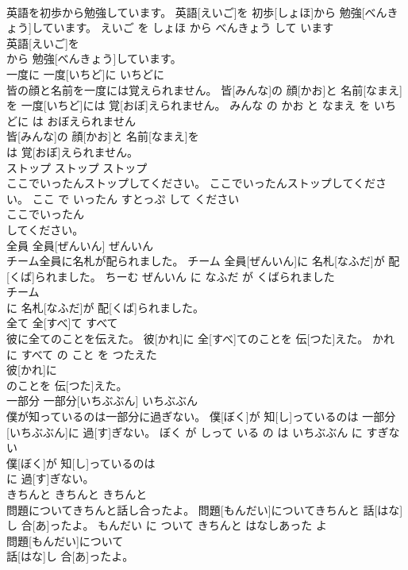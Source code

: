 \documentclass[8pt]{extreport}
\begin{document}
\begin{CJK}{UTF8}{min}
\\	英語を初歩から勉強しています。	英語[えいご]を 初歩[しょほ]から 勉強[べんきょう]しています。	えいご を しょほ から べんきょう して います	
\\	英語[えいご]を
\\	から 勉強[べんきょう]しています。			
\\	一度に	一度[いちど]に	いちどに	
\\	皆の顔と名前を一度には覚えられません。	皆[みんな]の 顔[かお]と 名前[なまえ]を 一度[いちど]には 覚[おぼ]えられません。	みんな の かお と なまえ を いちどに は おぼえられません	
\\	皆[みんな]の 顔[かお]と 名前[なまえ]を
\\	は 覚[おぼ]えられません。			
\\	ストップ	ストップ	ストップ	
\\	ここでいったんストップしてください。	ここでいったんストップしてください。	ここ で いったん すとっぷ して ください	
\\	ここでいったん
\\	してください。			
\\	全員	全員[ぜんいん]	ぜんいん	
\\	チーム全員に名札が配られました。	チーム 全員[ぜんいん]に 名札[なふだ]が 配[くば]られました。	ちーむ ぜんいん に なふだ が くばられました	
\\	チーム
\\	に 名札[なふだ]が 配[くば]られました。			
\\	全て	全[すべ]て	すべて	
\\	彼に全てのことを伝えた。	彼[かれ]に 全[すべ]てのことを 伝[つた]えた。	かれ に すべて の こと を つたえた	
\\	彼[かれ]に
\\	のことを 伝[つた]えた。			
\\	一部分	一部分[いちぶぶん]	いちぶぶん	
\\	僕が知っているのは一部分に過ぎない。	僕[ぼく]が 知[し]っているのは 一部分[いちぶぶん]に 過[す]ぎない。	ぼく が しって いる の は いちぶぶん に すぎない	
\\	僕[ぼく]が 知[し]っているのは
\\	に 過[す]ぎない。			
\\	きちんと	きちんと	きちんと	
\\	問題についてきちんと話し合ったよ。	問題[もんだい]についてきちんと 話[はな]し 合[あ]ったよ。	もんだい に ついて きちんと はなしあった よ	
\\	問題[もんだい]について
\\	話[はな]し 合[あ]ったよ。			

\end{CJK}
\end{document}

